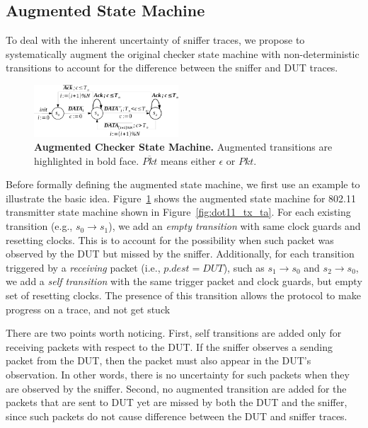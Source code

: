 \subsection{Augmented State Machine}
\label{subsec:augment}

To deal with the inherent uncertainty of sniffer traces, we propose to
systematically augment the original checker state machine with non-deterministic
transitions to account for the difference between the sniffer and DUT traces.


\begin{figure}[t!]
  \centering
  \includegraphics[width=0.48\textwidth]{./figures/dot11_tx_checker.pdf}
  \caption{\textbf{Augmented Checker State Machine.} Augmented transitions are
  highlighted in bold face. $\overline{Pkt}$ means either $\epsilon$ or $Pkt$.}
  \label{fig:augment}
\end{figure}


Before formally defining the augmented state machine, we first use an example to
illustrate the basic idea.
%
Figure~\ref{fig:augment} shows the augmented state machine
for 802.11 transmitter state machine shown in Figure~\ref{fig:dot11_tx_ta}.
%
For each existing transition (e.g., $s_0\rightarrow s_1$), we add an \textit{empty
transition} with same clock guards and resetting
clocks.
%
This is to account for the possibility when such packet was observed by
the DUT but missed by the sniffer.
%
Additionally, for each transition triggered
by a \textit{receiving} packet (i.e., $p.dest = DUT$), such as $s_1\rightarrow
s_0$ and $s_2\rightarrow s_0$, we add a \textit{self transition} with the same
trigger packet and clock guards, but empty set of resetting clocks.
%
The presence of this transition allows the protocol to make progress on a trace,
and not get stuck

There are two points worth noticing.
%
First, self transitions are added only for
receiving packets with respect to the DUT.
%
If the sniffer observes a sending packet from the DUT, then the packet must
also appear in the DUT's observation.
%
In other words, there is no uncertainty for such packets when they
are observed by the sniffer.
%
Second, no augmented transition are added for the packets that are sent to DUT yet
are missed by both the DUT and the sniffer, since such packets do not cause
difference between the DUT and sniffer traces.

